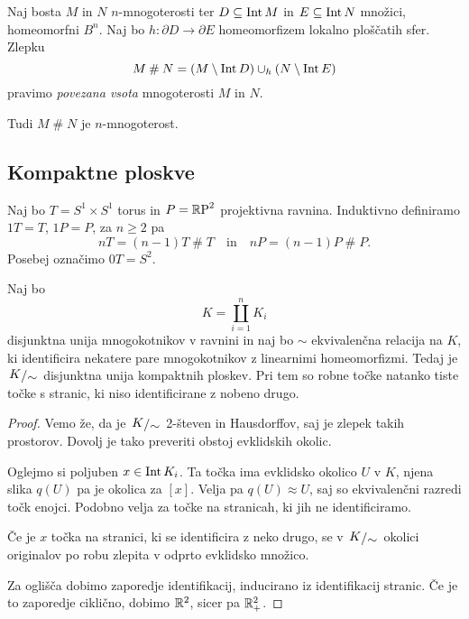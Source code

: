 \begin{definicija}
Naj bosta $M$ in $N$ $n$-mnogoterosti ter $D \subseteq \operatorname{Int} M$ in
$E \subseteq \operatorname{Int} N$ množici, homeomorfni $B^n$. Naj bo
$h \colon \partial D \to \partial E$ homeomorfizem lokalno
ploščatih sfer. Zlepku
\[
M \mathbin{\#} N = (M \setminus \operatorname{Int} D) \cup_h (N \setminus \operatorname{Int} E)
\]
pravimo \emph{povezana vsota}
mnogoterosti $M$ in $N$.
\end{definicija}

\begin{opomba}
Tudi $M \mathbin{\#} N$ je $n$-mnogoterost.
\end{opomba}

\newpage

\subsection{Kompaktne ploskve}


\begin{definicija}
Naj bo $T = S^1 \times S^1$ torus in $P = \mathbb{R}\!\operatorname{P}^{2}$ projektivna
ravnina. Induktivno definiramo $1T = T$, $1P = P$, za $n \geq 2$ pa
\[
nT = (n-1)T \mathbin{\#} T
\quad \text{in} \quad
nP = (n-1)P \mathbin{\#} P.
\]
Posebej označimo $0T = S^2$.
\end{definicija}

\begin{trditev}
Naj bo
\[
K = \coprod_{i=1}^n K_i
\]
disjunktna unija mnogokotnikov v ravnini in naj bo $\sim$
ekvivalenčna relacija na $K$, ki identificira nekatere pare
mnogokotnikov z linearnimi homeomorfizmi. Tedaj je $\kvoc{K}{\sim}$
disjunktna unija kompaktnih ploskev. Pri tem so robne točke natanko
tiste točke s stranic, ki niso identificirane z nobeno drugo.
\end{trditev}

\begin{proof}
Vemo že, da je $\kvoc{K}{\sim}$ 2-števen in Hausdorffov, saj je
zlepek takih prostorov. Dovolj je tako preveriti obstoj evklidskih
okolic.

Oglejmo si poljuben $x \in \operatorname{Int} K_i$. Ta točka ima evklidsko
okolico $U$ v $K$, njena slika $q(U)$ pa je okolica za $[x]$. Velja
pa $q(U) \approx U$, saj so ekvivalenčni razredi točk enojci.
Podobno velja za točke na stranicah, ki jih ne identificiramo.

Če je $x$ točka na stranici, ki se identificira z neko drugo, se v
$\kvoc{K}{\sim}$ okolici originalov po robu zlepita v odprto
evklidsko množico.

Za oglišča dobimo zaporedje identifikacij, inducirano iz
identifikacij stranic. Če je to zaporedje ciklično, dobimo $\mathbb{R}^2$,
sicer pa $\mathbb{R}_+^2$.
\end{proof}

